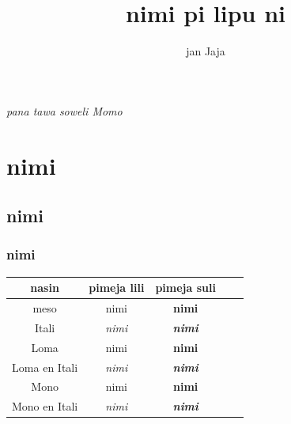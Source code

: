 \documentclass[a4paper]{amsbook}
\title{nimi pi lipu ni}
\author{jan Jaja}
\begin{document}
\frontmatter

\maketitle

\begin{titlepage}
\vspace*{\fill}
\begin{center}
\textit{pana tawa soweli Momo}
\end{center}
\vspace*{\fill}
\end{titlepage}

\tableofcontents

\mainmatter

\section{nimi}

\subsection{nimi}

\subsubsection{nimi}

\begin{center}
    \begin{tabular}{|c|c|c|c|c|}
        \hline
        nasin & pimeja lili & pimeja suli \\
        \hline
        meso & nimi & {\bfseries nimi} \\
        Itali & {\itshape nimi} & {\itshape \bfseries nimi} \\
        Loma & {\rmfamily nimi} & {\rmfamily \bfseries nimi} \\
        Loma en Itali & {\rmfamily \itshape nimi} & {\rmfamily \itshape \bfseries nimi} \\
        Mono & {\ttfamily nimi} & {\ttfamily \bfseries nimi} \\
        Mono en Itali & {\ttfamily \itshape nimi} & {\ttfamily \itshape \bfseries nimi} \\
        \hline
    \end{tabular}
\end{center}
\end{document}
